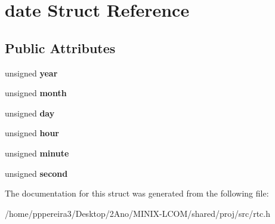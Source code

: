 \hypertarget{structdate}{}\section{date Struct Reference}
\label{structdate}
\subsection*{Public Attributes}
\begin{DoxyCompactItemize}
\item 
unsigned {\bfseries year}
\item 
unsigned {\bfseries month}
\item 
unsigned {\bfseries day}
\item 
unsigned {\bfseries hour}
\item 
unsigned {\bfseries minute}
\item 
unsigned {\bfseries second}
\end{DoxyCompactItemize}


The documentation for this struct was generated from the following file\+:\begin{DoxyCompactItemize}
\item 
/home/pppereira3/\+Desktop/2\+Ano/\+M\+I\+N\+I\+X-\/\+L\+C\+O\+M/shared/proj/src/rtc.\+h\end{DoxyCompactItemize}
